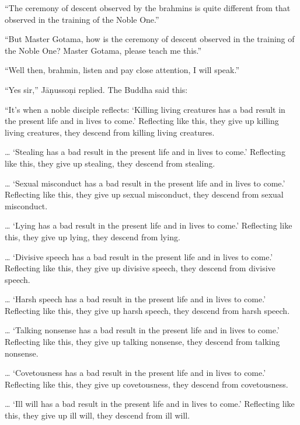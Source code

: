 \documentclass[12pt,openany]{book}%
\begin{document}
“The ceremony of descent observed by the brahmins is quite different from that observed in the training of the Noble One.” 

“But Master Gotama, how is the ceremony of descent observed in the training of the Noble One? Master Gotama, please teach me this.” 

“Well then, brahmin, listen and pay close attention, I will speak.” 

“Yes sir,” \textsanskrit{Jāṇussoṇi} replied. The Buddha said this: 

“It’s when a noble disciple reflects: ‘Killing living creatures has a bad result in the present life and in lives to come.’ Reflecting like this, they give up killing living creatures, they descend from killing living creatures. 

… ‘Stealing has a bad result in the present life and in lives to come.’ Reflecting like this, they give up stealing, they descend from stealing. 

… ‘Sexual misconduct has a bad result in the present life and in lives to come.’ Reflecting like this, they give up sexual misconduct, they descend from sexual misconduct. 

… ‘Lying has a bad result in the present life and in lives to come.’ Reflecting like this, they give up lying, they descend from lying. 

… ‘Divisive speech has a bad result in the present life and in lives to come.’ Reflecting like this, they give up divisive speech, they descend from divisive speech. 

… ‘Harsh speech has a bad result in the present life and in lives to come.’ Reflecting like this, they give up harsh speech, they descend from harsh speech. 

… ‘Talking nonsense has a bad result in the present life and in lives to come.’ Reflecting like this, they give up talking nonsense, they descend from talking nonsense. 

… ‘Covetousness has a bad result in the present life and in lives to come.’ Reflecting like this, they give up covetousness, they descend from covetousness. 

… ‘Ill will has a bad result in the present life and in lives to come.’ Reflecting like this, they give up ill will, they descend from ill will. 
\end{document}
